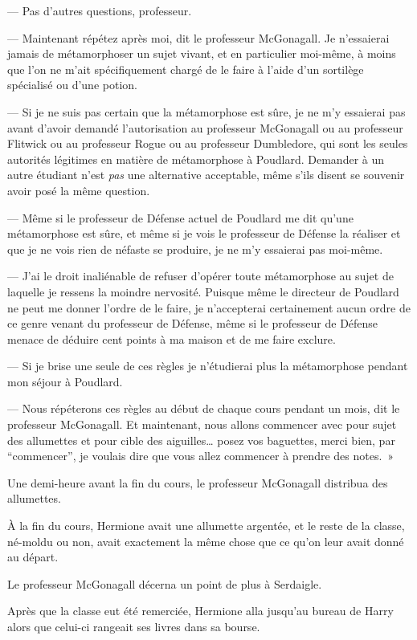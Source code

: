 --- Pas d'autres questions, professeur.

--- Maintenant répétez après moi, dit le professeur McGonagall. Je n'essaierai jamais de métamorphoser un sujet vivant, et en particulier moi-même, à moins que l'on ne m'ait spécifiquement chargé de le faire à l'aide d'un sortilège spécialisé ou d'une potion.

--- Si je ne suis pas certain que la métamorphose est sûre, je ne m'y essaierai pas avant d'avoir demandé l'autorisation au professeur McGonagall ou au professeur Flitwick ou au professeur Rogue ou au professeur Dumbledore, qui sont les seules autorités légitimes en matière de métamorphose à Poudlard. Demander à un autre étudiant n'est \emph{pas} une alternative acceptable, même s'ils disent se souvenir avoir posé la même question.

--- Même si le professeur de Défense actuel de Poudlard me dit qu'une métamorphose est sûre, et même si je vois le professeur de Défense la réaliser et que je ne vois rien de néfaste se produire, je ne m'y essaierai pas moi-même.

--- J'ai le droit inaliénable de refuser d'opérer toute métamorphose au sujet de laquelle je ressens la moindre nervosité. Puisque même le directeur de Poudlard ne peut me donner l'ordre de le faire, je n'accepterai certainement aucun ordre de ce genre venant du professeur de Défense, même si le professeur de Défense menace de déduire cent points à ma maison et de me faire exclure.

--- Si je brise une seule de ces règles je n'étudierai plus la métamorphose pendant mon séjour à Poudlard.

--- Nous répéterons ces règles au début de chaque cours pendant un mois, dit le professeur McGonagall. Et maintenant, nous allons commencer avec pour sujet des allumettes et pour cible des aiguilles… posez vos baguettes, merci bien, par “commencer”, je voulais dire que vous allez commencer à prendre des notes.~»

Une demi-heure avant la fin du cours, le professeur McGonagall distribua des allumettes.

À la fin du cours, Hermione avait une allumette argentée, et le reste de la classe, né-moldu ou non, avait exactement la même chose que ce qu'on leur avait donné au départ.

Le professeur McGonagall décerna un point de plus à Serdaigle.

\later

Après que la classe eut été remerciée, Hermione alla jusqu'au bureau de Harry alors que celui-ci rangeait ses livres dans sa bourse.

